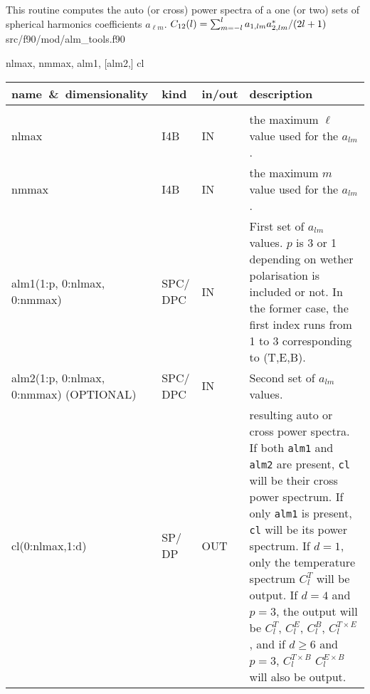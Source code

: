 
\sloppy


\section[alm2cl*]{ }
\label{sub:alm2cl}
\author{Eric Hivon}

\begin{facility}
{This routine computes the auto (or cross) power spectra of a one (or two) sets of spherical harmonics
  coefficients $a_{\ell m}$.
$C_{12}(l) = \sum_{m=-l}^{l} a_{1,l m}
  a_{2,l m}^* / (2 l +1) $ }
{src/f90/mod/alm\_tools.f90}
\end{facility}

\begin{f90format}
{nlmax, nmmax, alm1, [alm2,] cl}
\end{f90format}

\begin{arguments}
{
\begin{tabular}{p{0.35\hsize} p{0.05\hsize} p{0.1\hsize} p{0.40\hsize}} \hline  
\textbf{name~\&~dimensionality} & \textbf{kind} & \textbf{in/out} & \textbf{description} \\ \hline
                   &   &   &                           \\ %
nlmax & I4B & IN & the maximum $\ell$ value used for the $a_{lm}$. \\
nmmax & I4B & IN & the maximum $m$ value used for the $a_{lm}$. \\
alm1(1:p, 0:nlmax, 0:nmmax) & SPC/ DPC & IN & First set of $a_{lm}$ values. $p$
                   is 3 or 1 depending on wether polarisation is included or
                   not. In the former case, the first index runs from 1 to 3 corresponding to (T,E,B). \\
alm2(1:p, 0:nlmax, 0:nmmax) \hskip 3cm (OPTIONAL) & SPC/ DPC & IN & Second set of $a_{lm}$
                   values.  \\
cl(0:nlmax,1:d) & SP/ DP & OUT & resulting auto or cross power spectra. 
                   If both {\tt alm1} and {\tt alm2} are present, {\tt cl} will
                   be their cross power spectrum. If only {\tt alm1} is present,
                   {\tt cl} will be its power spectrum. 
		   If $d=1$, only the temperature spectrum
                   $C_l^T$ will
                   be output. If $d=4$ and $p=3$, the output will be $C_l^T$, $C_l^E$,
                   $C_l^B$, $C_l^{T\times E}$, and if $d\geq 6$ and $p=3$, $C_l^{T\times
                   B}$  $C_l^{E\times B}$ will also be output.
\end{tabular}
}
\end{arguments}

